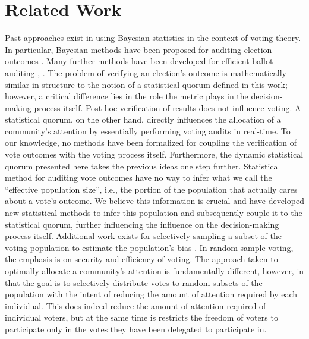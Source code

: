 \documentclass[format=acmsmall, review=true, screen=true, anonymous=true]{acmart}
\begin{document}
\section{Related Work}
\label{sec:related-work}

Past approaches exist in using Bayesian statistics in the context of voting theory.  In particular, Bayesian methods have been proposed for auditing election outcomes \citep{rivest2012bayesian}.  Many further methods have been developed for efficient ballot auditing \cite{lindeman2012bravo}, \citep{rivest2017clipaudit}.  The problem of verifying an election's outcome is mathematically similar in structure to the notion of a statistical quorum defined in this work; however, a critical difference lies in the role the metric plays in the decision-making process itself.  Post hoc verification of results does not influence voting.  A statistical quorum, on the other hand, directly influences the allocation of a community's attention by essentially performing voting audits in real-time. To our knowledge, no methods have been formalized for coupling the verification of vote outcomes with the voting process itself. Furthermore, the dynamic statistical quorum presented here takes the previous ideas one step further.  Statistical method for auditing vote outcomes have no way to infer what we call the ``effective population size'', i.e., the portion of the population that actually cares about a vote's outcome.  We believe this information is crucial and have developed new statistical methods to infer this population and subsequently couple it to the statistical quorum, further influencing the influence on the decision-making process itself.  Additional work exists for selectively sampling a subset of the voting population to estimate the population's bias \cite{chaum2016random}. In random-sample voting, the emphasis is on security and efficiency of voting.  The approach taken to optimally allocate a community's attention is fundamentally different, however, in that the goal is to selectively distribute votes to random subsets of the population with the intent of reducing the amount of attention required by each individual.  This does indeed reduce the amount of attention required of individual voters, but at the same time is restricts the freedom of voters to participate only in the votes they have been delegated to participate in.

%
%
\end{document}
